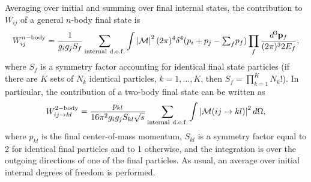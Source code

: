 \documentclass[a4paper,10pt,oneside]{book}
\begin{document}
Averaging over initial and summing over final internal states, the
contribution to $W_{ij}$ of a general $n$-body final state is
\begin{equation}
  W^{n\rm{-body}}_{ij} = 
  \frac{1}{g_i g_j S_f} \sum_{\rm{internal~d.o.f.}} 
  \int  \left| {\cal M} \right|^2 (2\pi)^4 
\delta^4(p_i+p_j-{\textstyle \sum_f}p_f) \prod_f
   \frac{d^3{\bf p}_f}{(2\pi)^3 2E_f} , 
\end{equation}
where $S_f$ is a symmetry factor accounting for identical final state
particles (if there are $K$ sets of $N_k$ identical particles,
$k=1,\dots,K$, then $S_f = \prod_{k=1}^{K} N_k!$).  In particular, 
the contribution
of a two-body final state can be written as
\begin{equation}
  W^{\rm{2-body}}_{ij\to kl} = \frac{p_{kl}}{16\pi^2 g_i g_j S_{kl} \sqrt{s}}
  \sum_{\rm{internal~d.o.f.}} \int \left| {\cal M}(ij\to kl) \right|^2
  d\Omega ,
\end{equation}
where $p_{kl}$ is the final center-of-mass momentum, $S_{kl}$ is a
symmetry factor equal to 2 for identical final particles and to 1
otherwise, and the integration is over the outgoing directions of
one of the final particles.  As usual, an average over initial
internal degrees of freedom is performed.
\end{document}
